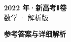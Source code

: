 \documentclass[zihao=-4, a4paper]{ctexart}
\begin{document}
\begin{center}
  {\Large\bfseries 2022 年·新高考Ⅱ卷}\\[4pt]
  {\large 数学 · 解析版}
\end{center}
\medskip
{}

\clearpage
{}
\begin{center}{\Large\bfseries 参考答案与详细解析}\end{center}
\medskip

\end{document}
